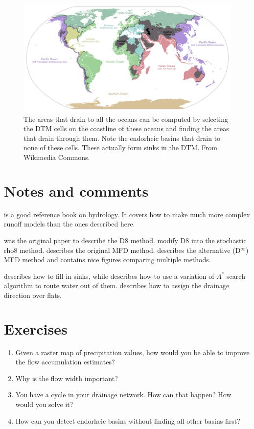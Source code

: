 \begin{figure}
\centering
\includegraphics[width=\linewidth]{figs/Ocean_drainage}
\caption{The areas that drain to all the oceans can be computed by selecting the DTM cells on the coastline of these oceans and finding the areas that drain through them.
Note the endorheic basins that drain to none of these cells.
These actually form sinks in the DTM\@.
From Wikimedia Commons.}%
\label{fig:oceans}
\end{figure}

%
\section{Notes and comments}

\citet{Beven12} is a good reference book on hydrology.
It covers how to make much more complex runoff models than the ones described here.

\citet{OCallaghan84} was the original paper to describe the D8 method.
\citet{Fairfield91} modify D8 into the stochastic rho8 method.
\citet{Quinn91} describes the original MFD method.
\citet{Tarborton97} describes the alternative (D\(^{\infty}\)) MFD method and contains nice figures comparing multiple methods.

\citet{Barnes14a} describes how to fill in sinks, while \citet{Metz11} describes how to use a variation of \(A^{*}\) search algorithm to route water out of them.
\citet{Barnes14} describes how to assign the drainage direction over flats.

%
\section{Exercises}

\begin{enumerate}
\item Given a raster map of precipitation values, how would you be able to improve the flow accumulation estimates?
\item Why is the flow width important?
\item You have a cycle in your drainage network. How can that happen? How would you solve it?
\item How can you detect endorheic basins without finding all other basins first?
\end{enumerate}
